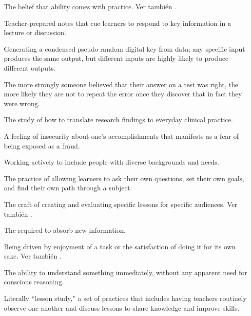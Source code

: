 \begin{description}
 The belief that ability comes with
practice. Ver también .

 Teacher-prepared notes that cue
learners to respond to key information in a lecture or discussion.

 Generating a condensed pseudo-random digital key
from data; any specific input produces the same output, but different inputs are
highly likely to produce different outputs.

 The more strongly someone
believed that their answer on a test was right, the more likely they are not to
repeat the error once they discover that in fact they were wrong.

 The study of how to
translate research findings to everyday clinical practice.

 A feeling of insecurity about
one's accomplishments that manifests as a fear of being exposed as a fraud.

 Working actively to include people with
diverse backgrounds and needs.

 The practice of
allowing learners to ask their own questions, set their own goals, and find
their own path through a subject.

 The craft of creating and
evaluating specific lessons for specific audiences. Ver también
.

 The 
required to absorb new information.

 Being driven by enjoyment
of a task or the satisfaction of doing it for its own sake.  Ver también
.

 The ability to understand something immediately,
without any apparent need for conscious reasoning.

 Literally ``lesson study,'' a set of
practices that includes having teachers routinely observe one another and
discuss lessons to share knowledge and improve skills.


\end{description}
